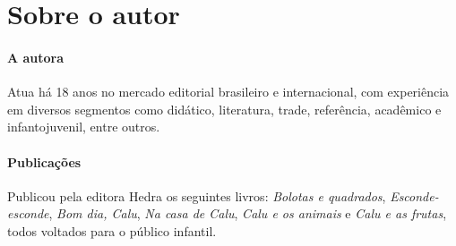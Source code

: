 \documentclass[11pt]{extarticle}
\begin{document}
\section{Sobre o autor}


\paragraph{A autora}
Atua há 18 anos no 
mercado editorial brasileiro e internacional, com experiência 
em diversos segmentos como didático, literatura, trade, 
referência, acadêmico e infantojuvenil, entre outros. 

\paragraph{Publicações}
Publicou pela editora Hedra os seguintes livros: \emph{Bolotas e quadrados},
\emph{Esconde-esconde}, \emph{Bom dia, Calu}, \emph{Na casa de Calu}, \emph{Calu e os animais} e
\emph{Calu e as frutas}, todos voltados para o público infantil.

\reversemarginpar
\marginparwidth=5cm
\end{document}
